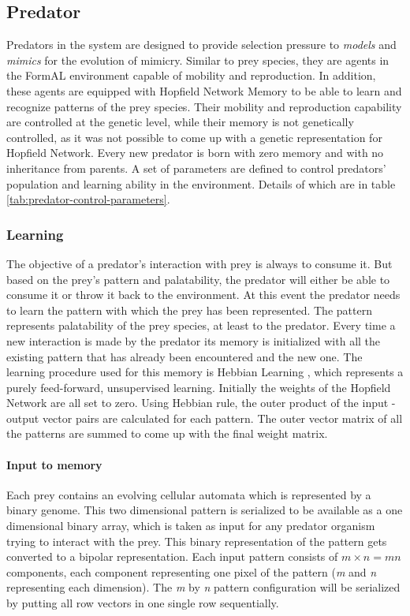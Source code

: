 \documentclass[letterpaper]{article}
\numberwithin{equation}{section}
\begin{document}
\subsection{Predator}

Predators in the system are designed to provide selection pressure to \textit{models} and \textit{mimics} for the evolution of mimicry. Similar to prey species, they are agents in the FormAL environment capable of mobility and reproduction. In addition, these agents are equipped with Hopfield Network Memory to be able to learn and recognize patterns of the prey species. Their mobility and reproduction capability are controlled at the genetic level, while their memory is not genetically controlled, as it was not possible to come up with a genetic representation for Hopfield Network. Every new predator is born with zero memory and with no inheritance from parents. A set of parameters are defined to control predators' population and learning ability in the environment. Details of which are in table \ref{tab:predator-control-parameters}.

\subsubsection{Learning}
The objective of a predator's interaction with prey is always to consume it. But based on the prey's pattern and palatability, the predator will either be able to consume it or throw it back to the environment. At this event the predator needs to learn the pattern with which the prey has been represented. The pattern represents palatability of the prey species, at least to the predator. Every time a new interaction is made by the predator its memory is initialized with all the existing pattern that has already been encountered and the new one. The learning procedure used for this memory is Hebbian Learning \citep{hebb1949}, which represents a purely feed-forward, unsupervised learning. Initially the weights of the Hopfield Network are all set to zero. Using Hebbian rule, the outer product of the input - output vector pairs are calculated for each pattern. The outer vector matrix of all the patterns are summed to come up with the final weight matrix.

\paragraph{Input to memory}
Each prey contains an evolving cellular automata which is represented by a binary genome. This two dimensional pattern is serialized to be available as a one dimensional binary array, which is taken as input for any predator organism trying to interact with the prey. This binary representation of the pattern gets converted to a bipolar representation. Each input pattern consists of \(\textit{m} \times \textit{n} = \textit{mn}\) components, each component representing one pixel of the pattern (\textit{m} and \textit{n} representing each dimension). The \textit{m} by \textit{n} pattern configuration will be serialized by putting all row vectors in one single row sequentially.
\end{document}
